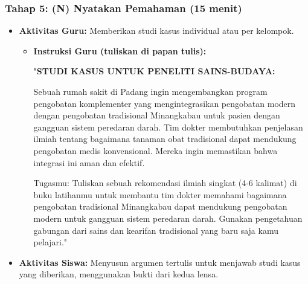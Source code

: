 \documentclass[a4paper,12pt]{article}
\begin{document}
\subsubsection{Tahap 5: (N) Nyatakan Pemahaman (15 menit)}
\begin{itemize}
\item \textbf{Aktivitas Guru:} Memberikan studi kasus individual atau per kelompok.
    \begin{itemize}
    \item \textbf{Instruksi Guru (tuliskan di papan tulis):}
    
    "\textbf{STUDI KASUS UNTUK PENELITI SAINS-BUDAYA:}
    
    Sebuah rumah sakit di Padang ingin mengembangkan program pengobatan komplementer yang mengintegrasikan pengobatan modern dengan pengobatan tradisional Minangkabau untuk pasien dengan gangguan sistem peredaran darah. Tim dokter membutuhkan penjelasan ilmiah tentang bagaimana tanaman obat tradisional dapat mendukung pengobatan medis konvensional. Mereka ingin memastikan bahwa integrasi ini aman dan efektif.
    
    Tugasmu: Tuliskan sebuah rekomendasi ilmiah singkat (4-6 kalimat) di buku latihanmu untuk membantu tim dokter memahami bagaimana pengobatan tradisional Minangkabau dapat mendukung pengobatan modern untuk gangguan sistem peredaran darah. Gunakan pengetahuan gabungan dari sains dan kearifan tradisional yang baru saja kamu pelajari."
    \end{itemize}
\item \textbf{Aktivitas Siswa:} Menyusun argumen tertulis untuk menjawab studi kasus yang diberikan, menggunakan bukti dari kedua lensa.
\end{itemize}
\end{document}
